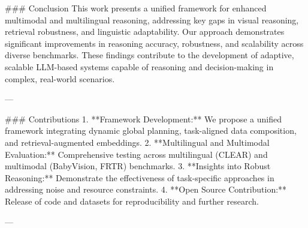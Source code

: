 ### Conclusion  
This work presents a unified framework for enhanced multimodal and multilingual reasoning, addressing key gaps in visual reasoning, retrieval robustness, and linguistic adaptability. Our approach demonstrates significant improvements in reasoning accuracy, robustness, and scalability across diverse benchmarks. These findings contribute to the development of adaptive, scalable LLM-based systems capable of reasoning and decision-making in complex, real-world scenarios.

---

### Contributions  
1. **Framework Development:** We propose a unified framework integrating dynamic global planning, task-aligned data composition, and retrieval-augmented embeddings.  
2. **Multilingual and Multimodal Evaluation:** Comprehensive testing across multilingual (CLEAR) and multimodal (BabyVision, FRTR) benchmarks.  
3. **Insights into Robust Reasoning:** Demonstrate the effectiveness of task-specific approaches in addressing noise and resource constraints.  
4. **Open Source Contribution:** Release of code and datasets for reproducibility and further research.  

---